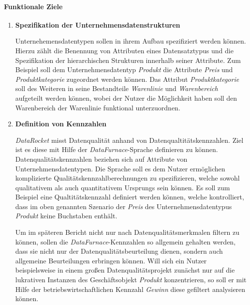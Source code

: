 \documentclass[
  language=german, %
  type=bachelor%
]{isthesis}
\begin{document}
\begin{content}
  \paragraph{Funktionale Ziele}
    \begin{enumerate}
      \item \textbf{Spezifikation der Unternehmensdatenstrukturen} 
        
        Unternehemensdatentypen sollen in ihrem Aufbau spezifiziert werden
        können. Hierzu zählt die Benennung von Attributen eines Datensatztypus
        und die Spezifikation der hierarchischen Strukturen innerhalb seiner
        Attribute. Zum Beispiel soll dem Unternehmensdatentyp \textit{Produkt}
        die Attribute \textit{Preis} und \textit{Produktkategorie} zugeordnet
        werden können. Das Attribut \textit{Produktkategorie} soll des Weiteren in
        seine Bestandteile \textit{Warenlinie} und \textit{Warenbereich}
        aufgeteilt werden können, wobei der Nutzer die Möglichkeit haben soll den Warenbereich der Warenlinie
        funktional unterzuordnen.

      \item \textbf{Definition von Kennzahlen} 

        \textit{DataRocket} misst Datenqualität anhand von
        Datenqualtitätskennzahlen. Ziel ist es diese mit Hilfe der
        \textit{DataFurnace}-Sprache definieren zu können.
        Datenqualitätskennzahlen beziehen sich auf Attribute von
        Unternehmensdatentypen. Die Sprache soll es dem Nutzer ermöglichen
        komplizierte Qualitätskennzahlberechnungen zu spezifizieren, welche
        sowohl qualitativem als auch quantitativem Ursprungs sein können. Es
        soll zum Beispiel eine Qualtitätskennzahl definiert werden können,
        welche kontrolliert, dass im oben genannten Szenario der \textit{Preis}
        des Unternehmensdatentypus \textit{Produkt} keine Buchstaben enthält.

        Um im späteren Bericht nicht nur nach Datenqualitätsmerkmalen filtern
        zu können, sollen die \textit{DataFurnace}-Kennzahlen so allgemein
        gehalten werden, dass sie nicht nur der Datenqualitätsbeurteilung
        dienen, sondern auch allgemeine Beurteilungen erbringen können. Will
        sich ein Nutzer beispielsweise in einem großen Datenqualitätsprojekt
        zunächst nur auf die lukrativen Instanzen des Geschäftsobjekt
        \textit{Produkt} konzentrieren, so soll er mit Hilfe der
        betriebswirtschaftlichen Kennzahl \textit{Gewinn} diese gefiltert
        analysieren können.
        

\end{enumerate}
\end{content}
\end{document}

